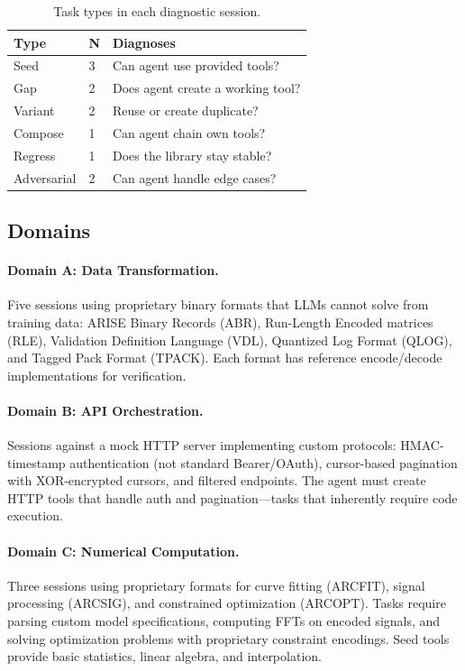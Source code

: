 \documentclass[10pt,twocolumn]{article}
\begin{document}
\begin{table}[t]
\centering
\footnotesize
\begin{tabular}{llp{3.2cm}}
\toprule
\textbf{Type} & \textbf{N} & \textbf{Diagnoses} \\
\midrule
Seed & 3 & Can agent use provided tools? \\
Gap & 2 & Does agent create a working tool? \\
Variant & 2 & Reuse or create duplicate? \\
Compose & 1 & Can agent chain own tools? \\
Regress & 1 & Does the library stay stable? \\
Adversarial & 2 & Can agent handle edge cases? \\
\bottomrule
\end{tabular}
\caption{Task types in each diagnostic session.}
\label{tab:task_types}
\end{table}

\subsection{Domains}

\paragraph{Domain A: Data Transformation.} Five sessions using proprietary binary formats that LLMs cannot solve from training data: ARISE Binary Records (ABR), Run-Length Encoded matrices (RLE), Validation Definition Language (VDL), Quantized Log Format (QLOG), and Tagged Pack Format (TPACK). Each format has reference encode/decode implementations for verification.

\paragraph{Domain B: API Orchestration.} Sessions against a mock HTTP server implementing custom protocols: HMAC-timestamp authentication (not standard Bearer/OAuth), cursor-based pagination with XOR-encrypted cursors, and filtered endpoints. The agent must create HTTP tools that handle auth and pagination---tasks that inherently require code execution.

\paragraph{Domain C: Numerical Computation.} Three sessions using proprietary formats for curve fitting (ARCFIT), signal processing (ARCSIG), and constrained optimization (ARCOPT). Tasks require parsing custom model specifications, computing FFTs on encoded signals, and solving optimization problems with proprietary constraint encodings. Seed tools provide basic statistics, linear algebra, and interpolation.
\end{document}
